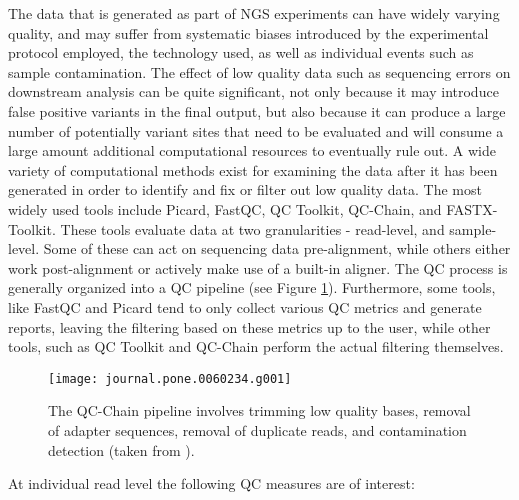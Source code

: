 The data that is generated as part of NGS experiments can have widely varying quality, and may suffer from systematic biases introduced by the experimental protocol employed, the technology used, as well as individual events such as sample contamination\autocites{cibulskis2011contest}{dohm2008substantial}{lauss2013monitoring}{aird2011analyzing}. The effect of low quality data such as sequencing errors on downstream analysis can be quite significant, not only because it may introduce false positive variants in the final output, but also because it can produce a large number of potentially variant sites that need to be evaluated and will consume a large amount additional computational resources to eventually rule out. A wide variety of computational methods exist for examining the data after it has been generated in order to identify and fix or filter out low quality data. The most widely used tools include Picard\autocite{Picard2018toolkit}, FastQC\autocite{andrews2010fastqc}, QC Toolkit\autocite{patel2012ngs}, QC-Chain\autocite{zhou2013qc}, and FASTX-Toolkit\autocite{gordon2010fastx}. These tools evaluate data at two granularities - read-level, and sample-level. Some of these can act on sequencing data pre-alignment, while others either work post-alignment or actively make use of a built-in aligner. The QC process is generally organized into a QC pipeline (see Figure \ref{fig:qc-chain}). Furthermore, some tools, like FastQC and Picard tend to only collect various QC metrics and generate reports, leaving the filtering based on these metrics up to the user, while other tools, such as QC Toolkit and QC-Chain perform the actual filtering themselves.

\begin{figure}[h!]
    \texttt{[image: journal.pone.0060234.g001]}
    \centering
    \caption {The QC-Chain pipeline involves trimming low quality bases, removal of adapter sequences, removal of duplicate reads, and contamination detection (taken from \autocite{zhou2013qc}).}
    \label{fig:qc-chain}
\end{figure}

At individual read level the following QC measures are of interest:

